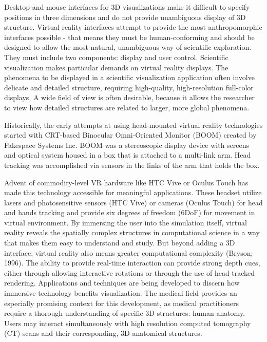 Desktop-and-mouse interfaces for 3D visualizations make it difficult to specify positions in three dimensions and do not provide unambiguous display of 3D structure. Virtual reality interfaces attempt to provide the most anthropomorphic interfaces possible - that means they must be human-conforming and should be designed to allow the most natural, unambiguous way of scientific exploration. They must include two components: display and user control. Scientific visualization makes particular demands on virtual reality displays. The phenomena to be displayed in a scientific visualization application often involve delicate and detailed structure, requiring high-quality, high-resolution full-color displays. A wide field of view is often desirable, because it allows the researcher to view how detailed structures are related to larger, more global phenomena.

Historically, the early attempts at using head-mounted virtual reality technologies started with CRT-based Binocular Omni-Oriented Monitor (BOOM) created by Fakespace Systems Inc. BOOM was a stereoscopic display device with screens and optical system housed in a box that is attached to a multi-link arm. Head tracking was accomplished via sensors in the links of the arm that holds the box.

Advent of commodity-level VR hardware like HTC Vive or Oculus Touch has made this technology accessible for meaningful applications. These headset utilize lasers and photosensitive sensors (HTC Vive) or cameras (Oculus Touch) for head and hands tracking and provide six degrees of freedom (6DoF) for movement in virtual environment. By immersing the user into the simulation itself, virtual reality reveals the spatially complex structures in computational science in a way that makes them easy to understand and study. But beyond adding a 3D interface, virtual reality also means greater computational complexity (Bryson; 1996). The ability to provide real-time interaction can provide strong depth cues, either through allowing interactive rotations or through the use of head-tracked rendering. Applications and techniques are being developed to discern how immersive technology benefits visualization. The medical field provides an especially promising context for this development, as medical practitioners require a thorough understanding of specific 3D structures: human anatomy. Users may interact simultaneously with high resolution computed tomography (CT) scans and their corresponding, 3D anatomical structures.


